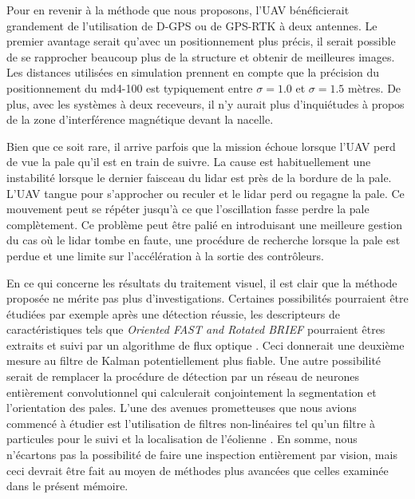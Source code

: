 Pour en revenir à la méthode que nous proposons, l'UAV bénéficierait grandement de l'utilisation de D-GPS ou de GPS-RTK à deux antennes. Le premier avantage serait qu’avec un positionnement plus précis, il serait possible de se rapprocher beaucoup plus de la structure et obtenir de meilleures images. Les distances utilisées en simulation prennent en compte que la précision du positionnement du md4-100 est typiquement entre $\sigma = 1.0$ et $\sigma = 1.5$ mètres. De plus, avec les systèmes à deux receveurs, il n'y aurait plus d'inquiétudes à propos de la zone d'interférence magnétique devant la nacelle.

Bien que ce soit rare, il arrive parfois que la mission échoue lorsque l'UAV perd de vue la pale qu'il est en train de suivre. La cause est habituellement une instabilité lorsque le dernier faisceau du lidar est près de la bordure de la pale. L'UAV tangue pour s'approcher ou reculer et le lidar perd ou regagne la pale. Ce mouvement peut se répéter jusqu'à ce que l'oscillation fasse perdre la pale complètement. Ce problème peut être palié en introduisant une meilleure gestion du cas où le lidar tombe en faute, une procédure de recherche lorsque la pale est perdue et une limite sur l'accélération à la sortie des contrôleurs.

En ce qui concerne les résultats du traitement visuel, il est clair que la méthode proposée ne mérite pas plus d'investigations. Certaines possibilités pourraient être étudiées par exemple après une détection réussie, les descripteurs de caractéristiques tels que \textit{Oriented FAST and Rotated BRIEF} \citep{Rublee2011} pourraient êtres extraits et suivi par un algorithme de flux optique \citep{Lucas1981}. Ceci donnerait une deuxième mesure au filtre de Kalman potentiellement plus fiable. Une autre possibilité serait de remplacer la procédure de détection par un réseau de neurones entièrement convolutionnel qui calculerait conjointement la segmentation et l'orientation des pales. L'une des avenues prometteuses que nous avions commencé à étudier est l'utilisation de filtres non-linéaires tel qu'un filtre à particules pour le suivi et la localisation de l'éolienne \citep{Sugandi2009}. En somme, nous n'écartons pas la possibilité de faire une inspection entièrement par vision, mais ceci devrait être fait au moyen de méthodes plus avancées que celles examinée dans le présent mémoire.

